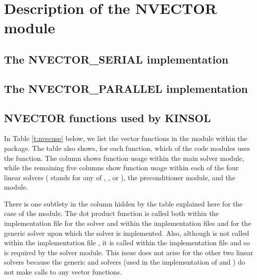 \chapter{Description of the NVECTOR module}\label{s:nvector}


\section{The NVECTOR\_SERIAL implementation}\label{ss:nvec_ser}


\section{The NVECTOR\_PARALLEL implementation}\label{ss:nvec_par}


\section{NVECTOR functions used by KINSOL}

In Table \ref{t:nvecuse} below, we list the vector functions in the 
{\nvector} module within the {\kinsol} package.
The table also shows, for each function, which of the code modules uses
the function. The {\kinsol} column shows function usage within the main
solver module, while the remaining five columns show function
usage within each of the four {\kinsol} linear solvers ({\kinspils}
stands for any of {\kinspgmr}, {\kinspbcg}, or {\kinsptfqmr}),
the {\kinbbdpre} preconditioner module, and the {\fkinsol} module.

There is one subtlety in the {\kinspils} column hidden by the table
explained here for the case of the {\kinspgmr} module. The dot product
function  is called both within the 
implementation file  for the {\kinspgmr} solver and within 
the implementation files  and 
for the generic {\spgmr} solver upon which the {\kinspgmr} solver is implemented.
Also, although  is not called within the
implementation file , it is called within the
implementation file  and so is required by the
{\kinspgmr} solver module. This issue does not arise for the other two
{\kinsol} linear solvers because the generic {\dense} and {\band} solvers
(used in the implementation of {\kindense} and {\kinband}) do not make calls
to any vector functions.

